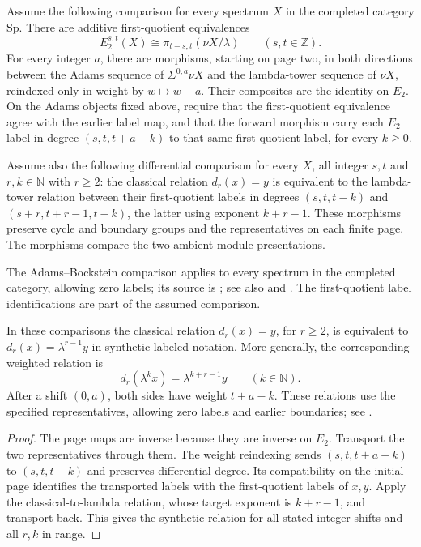 \begin{proposition}
\label{sem:Literature:adams-lambda-comparison-input}
\label{sem:Literature:differential-rigidity}
Assume the following comparison for every spectrum $X$ in the completed
category $\mathrm{Sp}$. There are additive first-quotient equivalences
\[
 E_2^{s,t}(X)\cong\pi_{t-s,t}(\nu X/\lambda)
 \qquad(s,t\in\mathbb Z).
\]
For every integer $a$, there are morphisms, starting on page two, in both
directions between the Adams sequence of $\Sigma^{0,a}\nu X$
and the lambda-tower sequence of $\nu X$,
reindexed only in weight by $w\mapsto w-a$.
Their composites are the identity on $E_2$. On the Adams objects fixed above, require that the first-quotient equivalence agree with the
earlier label map, and that the forward morphism carry each $E_2$ label in degree
$(s,t,t+a-k)$ to that same first-quotient label, for every $k\ge0$.

Assume also the following differential comparison for every $X$, all
integer $s,t$ and $r,k\in\mathbb N$ with $r\ge2$: the classical
relation $d_r(x)=y$ is equivalent to the
lambda-tower relation between their first-quotient labels in degrees
$(s,t,t-k)$ and $(s+r,t+r-1,t-k)$, the latter using exponent $k+r-1$.
These morphisms preserve cycle and boundary groups and the
representatives on each finite page. The morphisms compare the two ambient-module presentations.

The Adams--Bockstein comparison applies to every spectrum in the completed
category, allowing zero labels; its source is
\cite[Theorem 2.5(4)]{Marek2025}; see also \cite[Theorem A.8]{BHS}
and \cite[Theorem 3.8]{LWX126}. The first-quotient label identifications
are part of the assumed comparison.

In these comparisons the classical relation $d_r(x)=y$, for $r\ge2$,
is equivalent to $d_r(x)=\lambda^{r-1}y$ in synthetic labeled notation.
More generally, the corresponding weighted relation is
\[
 d_r(\lambda^kx)=\lambda^{k+r-1}y\qquad(k\in\mathbb N).
\]
After a shift $(0,a)$, both sides have weight $t+a-k$.
These relations use the specified representatives, allowing zero
labels and earlier boundaries; see \cite[Theorem A.8(3)]{BHS}.

\end{proposition}
\begin{proof}
The page maps are inverse because they are inverse on $E_2$. Transport
the two representatives through them. The weight reindexing sends
$(s,t,t+a-k)$ to $(s,t,t-k)$ and preserves differential degree. Its
compatibility on the initial page identifies the transported labels with the
first-quotient labels of $x,y$. Apply the classical-to-lambda relation,
whose target exponent is $k+r-1$, and transport back. This gives the
synthetic relation for all stated integer shifts and all $r,k$ in range.
\end{proof}

